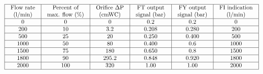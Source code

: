 $$\vbox{\offinterlineskip
\halign{\strut
\vrule \quad\hfil # \ \hfil & 
\vrule \quad\hfil # \ \hfil & 
\vrule \quad\hfil # \ \hfil & 
\vrule \quad\hfil # \ \hfil & 
\vrule \quad\hfil # \ \hfil & 
\vrule \quad\hfil # \ \hfil \vrule \cr
\noalign{\hrule}
%
Flow rate & Percent of & Orifice $\Delta$P & FT output & FY output & FI indication \cr
%
(l/min) & max. flow (\%) & (cmWC) & signal (bar) & signal (bar) & (l/min) \cr
%
\noalign{\hrule}
%
0 & 0 & 0 & 0.2 & 0.2 & 0 \cr
%
\noalign{\hrule}
%
200 & 10 & 3.2 & 0.208 & 0.280 & 200 \cr
%
\noalign{\hrule}
%
500 & 25 & 20 & 0.250 & 0.400 & 500 \cr
%
\noalign{\hrule}
%
1000 & 50 & 80 & 0.400 & 0.6 & 1000 \cr
%
\noalign{\hrule}
%
1500 & 75 & 180 & 0.650 & 0.8 & 1500 \cr
%
\noalign{\hrule}
%
1800 & 90 & 295.2 & 0.848 & 0.920 & 1800 \cr
%
\noalign{\hrule}
%
2000 & 100 & 320 & 1.00 & 1.00 & 2000 \cr
%
\noalign{\hrule}
} %
}$$ %












